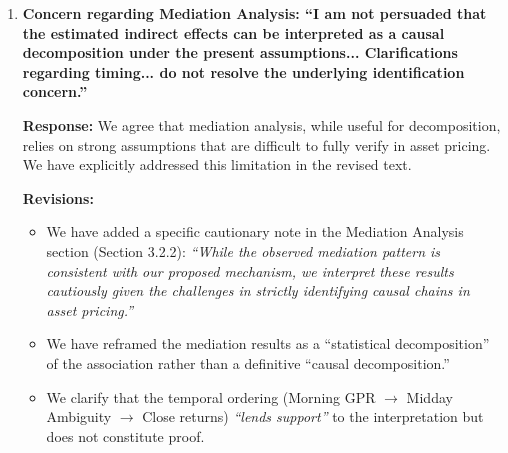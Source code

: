 \documentclass[12pt]{article}
\begin{document}
\begin{enumerate}
\begin{responsebox}
\begin{itemize}
        \item \textbf{Results \& Conclusion:}
        \begin{itemize}
            \item Throughout the results section and table notes (e.g., Table 2, Table 5), we have replaced ``impact'' with ``association'' or ``estimated coefficient'' where appropriate.
            \item In the Conclusion, we changed ``confirm our causal results'' to ``\textbf{provide further support for our interpretation}.''
            \item In Policy Implications, changed ``mitigate GPR's impacts'' to ``mitigate GPR's \textbf{adverse implications}.''
        \end{itemize}
    \end{itemize}
    
    These changes ensure that we describe our results as ``consistent with'' our proposed mechanism rather than definitively proving it.
    \vspace{0.5cm}
    \end{responsebox}

    \vspace{0.5cm}

    \item \textbf{Concern regarding Mediation Analysis: ``I am not persuaded that the estimated indirect effects can be interpreted as a causal decomposition under the present assumptions... Clarifications regarding timing... do not resolve the underlying identification concern.''}

    \begin{responsebox}
    \vspace{0.5cm}
    \textbf{Response:} We agree that mediation analysis, while useful for decomposition, relies on strong assumptions that are difficult to fully verify in asset pricing. We have explicitly addressed this limitation in the revised text.
    
    \textbf{Revisions:}
    \begin{itemize}
        \item We have added a specific cautionary note in the Mediation Analysis section (Section 3.2.2): \textit{``While the observed mediation pattern is consistent with our proposed mechanism, we interpret these results cautiously given the challenges in strictly identifying causal chains in asset pricing.''}
        \item We have reframed the mediation results as a ``statistical decomposition'' of the association rather than a definitive ``causal decomposition.''
        \item We clarify that the temporal ordering (Morning GPR $\rightarrow$ Midday Ambiguity $\rightarrow$ Close returns) \textit{``lends support''} to the interpretation but does not constitute proof.
    \end{itemize}
    \vspace{0.5cm}
    \end{responsebox}


\end{enumerate}
\end{document}
